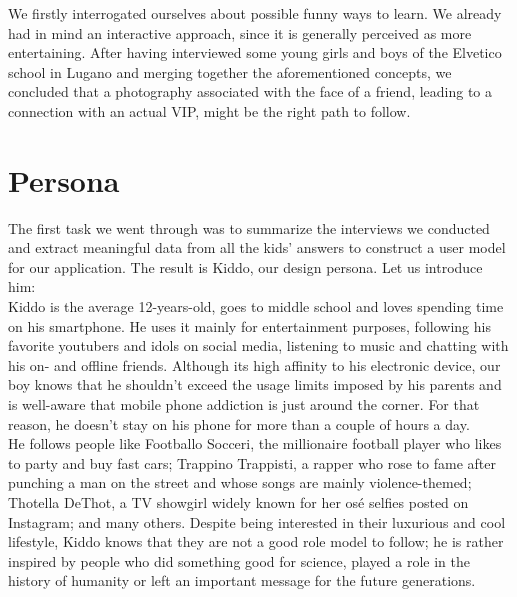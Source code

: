 \documentclass[12pt]{scrartcl}
\begin{document}
	We firstly interrogated ourselves about possible funny ways to learn. We already had in mind an interactive approach, since it is generally perceived as more entertaining. After having interviewed some young girls and boys of the Elvetico school in Lugano and merging together the aforementioned concepts, we concluded that a photography associated with the face of a friend, leading to a connection with an actual VIP, might be the right path to follow.\\


\section{Persona}

	
	The first task we went through was to summarize the interviews we conducted and extract meaningful data from all the kids' 
	answers to construct a user model for our application. The result is Kiddo, our design persona. Let us introduce him:\\
	
	Kiddo is the average 12-years-old, goes to middle school and loves spending time on his smartphone. He uses it mainly for 
	entertainment purposes, following his favorite youtubers and idols on social media, listening to music and chatting with his on- 
	and offline friends. Although its high affinity to his electronic device, our boy knows that he shouldn't exceed the usage limits 
	imposed by his parents and is well-aware that mobile phone addiction is just around the corner. For that reason, he doesn't
	stay on his phone for more than a couple of hours a day.\\
	
	He follows people like Footballo Socceri, the millionaire football player who likes to party and buy fast cars; 
	Trappino Trappisti, a rapper who rose to fame after punching a man on the street and whose songs are mainly violence-themed;
	Thotella DeThot, a TV showgirl widely known for her osé selfies posted on Instagram; and many others. Despite being interested 
	in their luxurious and cool lifestyle, Kiddo knows that they are not a good role model to follow; he is rather inspired by people
	who did something good for science, played a role in the history of humanity or left an important message for the future
	generations.\\
	
\end{document}

